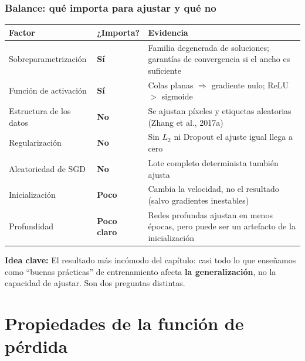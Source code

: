 \documentclass[aspectratio=169, 10pt]{beamer}
\newcommand{\idea}[1]{%
	\begin{tcolorbox}[colback=AccentGreen!6, colframe=AccentGreen, arc=3pt,
		width=\textwidth, boxsep=1pt, left=5pt, right=5pt, top=2pt, bottom=2pt,
		fontupper=\small]
		\RaggedRight\textbf{Idea clave:} #1
	\end{tcolorbox}
}
\begin{document}
\begin{frame}
\frametitle{Balance: qué importa para ajustar y qué no}
\begin{center}
\footnotesize
\begin{tabular}{llp{6.1cm}}
\toprule
\textbf{Factor} & \textbf{¿Importa?} & \textbf{Evidencia}\\
\midrule
Sobreparametrizaci\'on & \textcolor{AccentGreen!60!black}{\textbf{S\'i}}
	& Familia degenerada de soluciones; garant\'ias de convergencia si el ancho es suficiente\\
Funci\'on de activaci\'on & \textcolor{AccentGreen!60!black}{\textbf{S\'i}}
	& Colas planas $\Rightarrow$ gradiente nulo; ReLU $>$ sigmoide\\[3pt]
Estructura de los datos & \textcolor{StanfordRed}{\textbf{No}}
	& Se ajustan p\'ixeles y etiquetas aleatorias (Zhang et al., 2017a)\\
Regularizaci\'on & \textcolor{StanfordRed}{\textbf{No}}
	& Sin $L_2$ ni Dropout el ajuste igual llega a cero\\
Aleatoriedad de SGD & \textcolor{StanfordRed}{\textbf{No}}
	& Lote completo determinista tambi\'en ajusta\\
Inicializaci\'on & \textcolor{StanfordGray}{\textbf{Poco}}
	& Cambia la velocidad, no el resultado (salvo gradientes ines\-ta\-bles)\\
Profundidad & \textcolor{StanfordGray}{\textbf{Poco claro}}
	& Redes profundas ajustan en menos \'epocas, pero puede ser un artefacto de la inicializaci\'on\\
\bottomrule
\end{tabular}
\end{center}
\vspace{0.5em}
\idea{El resultado m\'as inc\'omodo del cap\'itulo: casi todo lo que ense\~namos como ``buenas pr\'acticas'' de entrenamiento afecta \textbf{la generalizaci\'on}, no la capacidad de ajustar. Son dos preguntas distintas.}
\end{frame}

\section{Propiedades de la función de pérdida}
\end{document}
